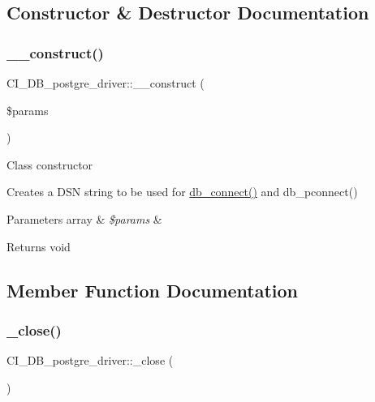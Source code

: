 \subsection{Constructor \& Destructor Documentation}
\mbox{\label{class_c_i___d_b__postgre__driver_a6994482eff405aa57460ac34396e0731}} 
\subsubsection{\texorpdfstring{\+\_\+\+\_\+construct()}{\_\_construct()}}
{\footnotesize\ttfamily C\+I\+\_\+\+D\+B\+\_\+postgre\+\_\+driver\+::\+\_\+\+\_\+construct (\begin{DoxyParamCaption}\item[{}]{\$params }\end{DoxyParamCaption})}

Class constructor

Creates a D\+SN string to be used for \mbox{\hyperlink{class_c_i___d_b__postgre__driver_a6e4aac2e78d4b010c05ec7ce170075f2}{db\+\_\+connect()}} and db\+\_\+pconnect()


\begin{DoxyParams}[1]{Parameters}
array & {\em \$params} & \\
\hline
\end{DoxyParams}
\begin{DoxyReturn}{Returns}
void 
\end{DoxyReturn}


\subsection{Member Function Documentation}
\mbox{\label{class_c_i___d_b__postgre__driver_aef6d453801af9f15243c7456d85119c0}} 
\subsubsection{\texorpdfstring{\+\_\+close()}{\_close()}}
{\footnotesize\ttfamily C\+I\+\_\+\+D\+B\+\_\+postgre\+\_\+driver\+::\+\_\+close (\begin{DoxyParamCaption}{ }\end{DoxyParamCaption})\hspace{0.3cm}{\ttfamily [protected]}}

